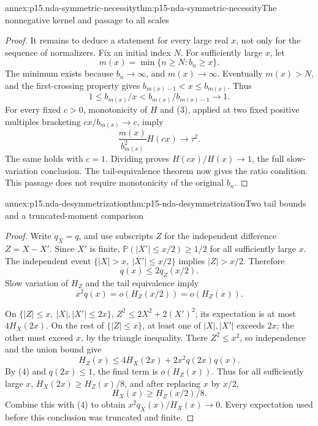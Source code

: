 \begin{annexitem}{annex:p15.nda-symmetric-necessity}{thm:p15-nda-symmetric-necessity}{The nonnegative kernel and passage to all scales}
\begin{proof}
It remains to deduce a statement for every large real \(x\),
not only for the sequence of normalizers.
Fix an initial index \(N\). For sufficiently large \(x\), let
\[
 m(x)=\min\{n\geq N:b_n\geq x\}.
 \]
The minimum exists because \(b_n\to\infty\), and \(m(x)\to\infty\).
Eventually \(m(x)>N\), and the first-crossing property gives
\(b_{m(x)-1}<x\leq b_{m(x)}\). Thus
\[
 1\leq b_{m(x)}/x
       <b_{m(x)}/b_{m(x)-1}\longrightarrow1.
 \]
For every fixed \(c>0\), monotonicity of \(H\) and (3),
applied at two fixed positive multiples bracketing
\(cx/b_{m(x)}\to c\), imply
\[
 \frac{m(x)}{b_{m(x)}^2}H(cx)\longrightarrow\tau^2.
 \]
The same holds with \(c=1\). Dividing proves
\(H(cx)/H(x)\to1\), the full slow-variation conclusion.
The tail-equivalence theorem now gives the ratio condition.
This passage does not require monotonicity of the original \(b_n\).
\end{proof}
\end{annexitem}

\begin{annexitem}{annex:p15.nda-desymmetrization}{thm:p15-nda-desymmetrization}{Two tail bounds and a truncated-moment comparison}
\begin{proof}
Write \(q_X=q\), and use subscripts \(Z\) for the independent
difference \(Z=X-X'\). Since \(X'\) is finite,
\(\mathbb P(|X'|\leq x/2)\geq1/2\) for all sufficiently large \(x\).
The independent event
\(\{|X|>x,\ |X'|\leq x/2\}\) implies \(|Z|>x/2\).
Therefore
\[
 q(x)\leq2q_Z(x/2).
 \]
Slow variation of \(H_Z\) and the tail equivalence imply
\[
 x^2q(x)=o(H_Z(x/2))=o(H_Z(x)).                           \tag{4}
 \]

On \(\{|Z|\leq x,\ |X|,|X'|\leq2x\}\),
\(Z^2\leq2X^2+2(X')^2\); its expectation is at most
\(4H_X(2x)\). On the rest of \(\{|Z|\leq x\}\),
at least one of \(|X|,|X'|\) exceeds \(2x\); the other must
exceed \(x\), by the triangle inequality.
There \(Z^2\leq x^2\), so independence and the union bound give
\[
 H_Z(x)\leq4H_X(2x)+2x^2q(2x)q(x).
 \]
By (4) and \(q(2x)\leq1\), the final term is \(o(H_Z(x))\).
Thus for all sufficiently large \(x\),
\(H_X(2x)\geq H_Z(x)/8\), and after replacing \(x\) by \(x/2\),
\[
 H_X(x)\geq H_Z(x/2)/8.
 \]
Combine this with (4) to obtain
\(x^2q_X(x)/H_X(x)\to0\).
Every expectation used before this conclusion was truncated and finite.
\end{proof}
\end{annexitem}

